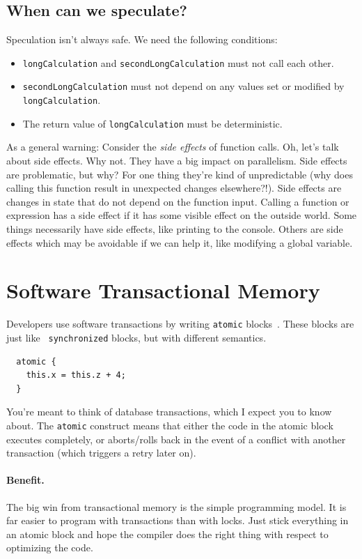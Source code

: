 \documentclass[a4paper]{report}
\begin{document}
\subsection*{When can we speculate?}
Speculation isn't always safe. We need the following conditions:
  \begin{itemize}
    \item {\tt longCalculation} and {\tt secondLongCalculation} must not call
      each other.
    \item {\tt secondLongCalculation} must not depend on
      any values set or modified by {\tt longCalculation}.
    \item The return value of {\tt longCalculation} must be deterministic.
  \end{itemize}

As a general warning: Consider the \emph{side effects} of function calls. Oh, let's talk about side effects. Why not. They have a big impact on parallelism. Side effects are problematic, but why? For one thing they're kind of unpredictable (why does calling this function result in unexpected changes elsewhere?!). Side effects are changes in state that do not depend on the function input. Calling a function or expression has a side effect if it has some visible effect on the outside world. Some things necessarily have side effects, like printing to the console. Others are side effects which may be avoidable if we can help it, like modifying a global variable.


\section*{Software Transactional Memory}
Developers use software transactions by 
writing {\tt atomic} blocks~\cite{stm}. These blocks are just like {\tt
  synchronized} blocks, but with different semantics.
\begin{lstlisting}
  atomic {
    this.x = this.z + 4;
  }
\end{lstlisting}
You're meant to think of database transactions, which I expect you to
know about. The {\tt atomic} construct means that either the code in
the atomic block executes completely, or aborts/rolls back in the
event of a conflict with another transaction (which triggers a retry
later on).

\paragraph{Benefit.} The big win from transactional memory is the simple
programming model. It is far easier to program with transactions than with
locks. Just stick everything in an atomic block and hope the compiler does the
right thing with respect to optimizing the code.
\end{document}

